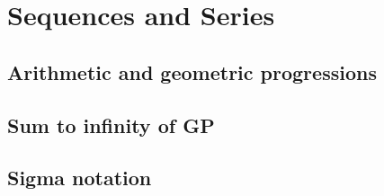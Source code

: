 
\section{Sequences and Series}

\subsection{Arithmetic and geometric progressions}


\subsection{Sum to infinity of GP}


\subsection{Sigma notation}

